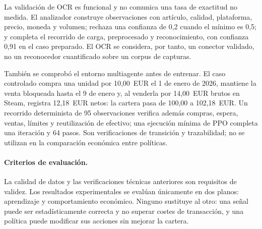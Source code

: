 La validación de OCR es funcional y no comunica una tasa de exactitud no medida. El analizador construye observaciones con artículo, calidad, plataforma, precio, moneda y volumen; rechaza una confianza de 0,2 cuando el mínimo es 0,5; y completa el recorrido de carga, preprocesado y reconocimiento, con confianza 0,91 en el caso preparado. El OCR se considera, por tanto, un conector validado, no un reconocedor cuantificado sobre un corpus de capturas.

También se comprobó el entorno multiagente antes de entrenar. El caso controlado compra una unidad por 10,00~EUR el 1 de enero de 2026, mantiene la venta bloqueada hasta el 9 de enero y, al venderla por 14,00~EUR brutos en Steam, registra 12,18~EUR netos: la cartera pasa de 100,00 a 102,18~EUR. Un recorrido determinista de 95 observaciones verifica además compras, espera, ventas, límites y reutilización de efectivo; una ejecución mínima de PPO completa una iteración y 64 pasos. Son verificaciones de transición y trazabilidad; no se utilizan en la comparación económica entre políticas.

\paragraph{Criterios de evaluación.}
\label{sec:metricas-experimentacion}

La calidad de datos y las verificaciones técnicas anteriores son requisitos de validez. Los resultados experimentales se evalúan únicamente en dos planos: aprendizaje y comportamiento económico. Ninguno sustituye al otro: una señal puede ser estadísticamente correcta y no superar costes de transacción, y una política puede modificar sus acciones sin mejorar la cartera.

